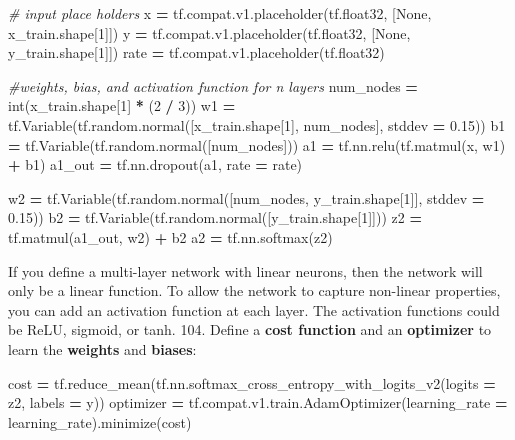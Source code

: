 \documentclass[]{book}
\newenvironment{Shaded}{\begin{snugshade}}{\end{snugshade}}
\newcommand{\DecValTok}[1]{\textcolor[rgb]{0.00,0.00,0.81}{#1}}
\newcommand{\FloatTok}[1]{\textcolor[rgb]{0.00,0.00,0.81}{#1}}
\newcommand{\CommentTok}[1]{\textcolor[rgb]{0.56,0.35,0.01}{\textit{#1}}}
\newcommand{\VariableTok}[1]{\textcolor[rgb]{0.00,0.00,0.00}{#1}}
\newcommand{\OperatorTok}[1]{\textcolor[rgb]{0.81,0.36,0.00}{\textbf{#1}}}
\newcommand{\BuiltInTok}[1]{#1}
\newcommand{\NormalTok}[1]{#1}
\begin{document}
\begin{Shaded}
\begin{Highlighting}[]
\CommentTok{# input place holders}
\NormalTok{x }\OperatorTok{=}\NormalTok{ tf.compat.v1.placeholder(tf.float32, [}\VariableTok{None}\NormalTok{, x_train.shape[}\DecValTok{1}\NormalTok{]])}
\NormalTok{y }\OperatorTok{=}\NormalTok{ tf.compat.v1.placeholder(tf.float32, [}\VariableTok{None}\NormalTok{, y_train.shape[}\DecValTok{1}\NormalTok{]])}
\NormalTok{rate }\OperatorTok{=}\NormalTok{ tf.compat.v1.placeholder(tf.float32)}

\CommentTok{#weights, bias, and activation function for n layers}
\NormalTok{num_nodes }\OperatorTok{=} \BuiltInTok{int}\NormalTok{(x_train.shape[}\DecValTok{1}\NormalTok{] }\OperatorTok{*}\NormalTok{ (}\DecValTok{2} \OperatorTok{/} \DecValTok{3}\NormalTok{))}
\NormalTok{w1 }\OperatorTok{=}\NormalTok{ tf.Variable(tf.random.normal([x_train.shape[}\DecValTok{1}\NormalTok{], num_nodes], stddev }\OperatorTok{=} \FloatTok{0.15}\NormalTok{))}
\NormalTok{b1 }\OperatorTok{=}\NormalTok{ tf.Variable(tf.random.normal([num_nodes]))}
\NormalTok{a1 }\OperatorTok{=}\NormalTok{ tf.nn.relu(tf.matmul(x, w1) }\OperatorTok{+}\NormalTok{ b1)}
\NormalTok{a1_out }\OperatorTok{=}\NormalTok{ tf.nn.dropout(a1, rate }\OperatorTok{=}\NormalTok{ rate)}

\NormalTok{w2 }\OperatorTok{=}\NormalTok{ tf.Variable(tf.random.normal([num_nodes, y_train.shape[}\DecValTok{1}\NormalTok{]], stddev }\OperatorTok{=} \FloatTok{0.15}\NormalTok{))}
\NormalTok{b2 }\OperatorTok{=}\NormalTok{ tf.Variable(tf.random.normal([y_train.shape[}\DecValTok{1}\NormalTok{]]))}
\NormalTok{z2 }\OperatorTok{=}\NormalTok{ tf.matmul(a1_out, w2) }\OperatorTok{+}\NormalTok{ b2}
\NormalTok{a2 }\OperatorTok{=}\NormalTok{ tf.nn.softmax(z2)}
\end{Highlighting}
\end{Shaded}

If you define a multi-layer network with linear neurons, then the network will only be a linear function. To allow the network to capture non-linear properties, you can add an activation function at each layer. The activation functions could be ReLU, sigmoid, or tanh.
104. Define a \textbf{cost function} and an \textbf{optimizer} to learn the \textbf{weights} and \textbf{biases}:

\begin{Shaded}
\begin{Highlighting}[]
\NormalTok{cost }\OperatorTok{=}\NormalTok{ tf.reduce_mean(tf.nn.softmax_cross_entropy_with_logits_v2(logits }\OperatorTok{=}\NormalTok{ z2, labels }\OperatorTok{=}\NormalTok{ y))}
\NormalTok{optimizer }\OperatorTok{=}\NormalTok{ tf.compat.v1.train.AdamOptimizer(learning_rate }\OperatorTok{=}\NormalTok{ learning_rate).minimize(cost)}
\end{Highlighting}
\end{Shaded}
\end{document}
